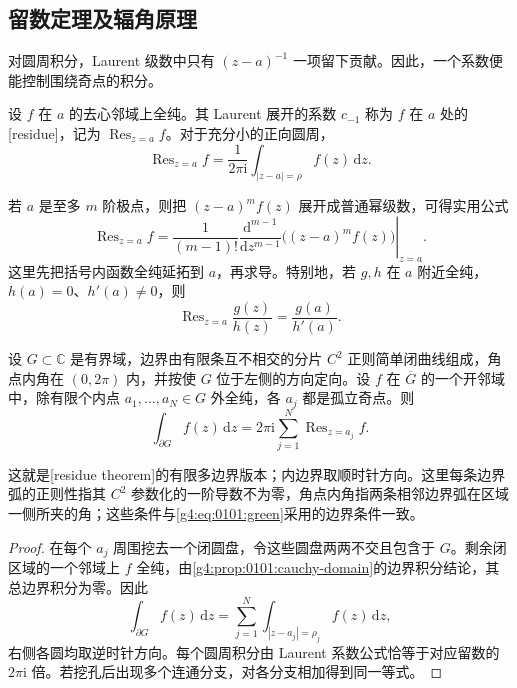 \subsection{留数定理及辐角原理}
\label{g4:subsec:0102:02}
对圆周积分，Laurent 级数中只有 \((z-a)^{-1}\) 一项留下贡献。因此，一个系数便能控制围绕奇点的积分。

\begin{definition}\label{g4:def:0102:residue}
	设 \(f\) 在 \(a\) 的去心邻域上全纯。其 Laurent 展开的系数 \(c_{-1}\) 称为 \(f\) 在 \(a\) 处的[residue]，记为 \(\operatorname{Res}_{z=a}f\)。对于充分小的正向圆周，
	\[
		\operatorname{Res}_{z=a}f
		=\frac{1}{2\pi\mathrm{i}}\int_{|z-a|=\rho}f(z)\,\mathrm{d}z.
	\]
\end{definition}

若 \(a\) 是至多 \(m\) 阶极点，则把 \((z-a)^m f(z)\) 展开成普通幂级数，可得实用公式
\[
	\operatorname{Res}_{z=a}f
	=\frac{1}{(m-1)!}
	\left.\frac{\mathrm{d}^{m-1}}{\mathrm{d}z^{m-1}}
	\bigl((z-a)^m f(z)\bigr)\right|_{z=a}.
\]
这里先把括号内函数全纯延拓到 \(a\)，再求导。特别地，若 \(g,h\) 在 \(a\) 附近全纯，\(h(a)=0\)、\(h'(a)\neq0\)，则
\[
	\operatorname{Res}_{z=a}\frac{g(z)}{h(z)}=\frac{g(a)}{h'(a)}.
\]

\begin{theorem}[留数定理]\label{g4:thm:0102:residue}
	设 \(G\subset\mathbb C\) 是有界域，边界由有限条互不相交的分片 \(C^2\) 正则简单闭曲线组成，角点内角在 \((0,2\pi)\) 内，并按使 \(G\) 位于左侧的方向定向。设 \(f\) 在 \(\overline G\) 的一个开邻域中，除有限个内点 \(a_1,\ldots,a_N\in G\) 外全纯，各 \(a_j\) 都是孤立奇点。则
	\[
		\int_{\partial G}f(z)\,\mathrm{d}z
		=2\pi\mathrm{i}\sum_{j=1}^N\operatorname{Res}_{z=a_j}f.
	\]
\end{theorem}
这就是[residue theorem]的有限多边界版本；内边界取顺时针方向。这里每条边界弧的正则性指其 \(C^2\) 参数化的一阶导数不为零，角点内角指两条相邻边界弧在区域一侧所夹的角；这些条件与\eqref{g4:eq:0101:green}采用的边界条件一致。
\begin{proof}
	在每个 \(a_j\) 周围挖去一个闭圆盘，令这些圆盘两两不交且包含于 \(G\)。剩余闭区域的一个邻域上 \(f\) 全纯，由\cref{g4:prop:0101:cauchy-domain}的边界积分结论，其总边界积分为零。因此
	\[
		\int_{\partial G}f(z)\,\mathrm{d}z
		=\sum_{j=1}^N\int_{|z-a_j|=\rho_j}f(z)\,\mathrm{d}z,
	\]
	右侧各圆均取逆时针方向。每个圆周积分由 Laurent 系数公式恰等于对应留数的 \(2\pi\mathrm{i}\) 倍。若挖孔后出现多个连通分支，对各分支相加得到同一等式。
\end{proof}


